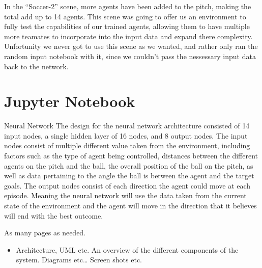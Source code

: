 In the “Soccer-2” scene, more agents have been added to the pitch, making the total add up to 14 agents. This scene was going to offer us an environment to fully test the capabilities of our trained agents, allowing them to have multiple more teamates to incorporate into the input data and expand there complexity. Unfortunity we never got to use this scene as we wanted, and rather only ran the random input notebook with it, since we couldn’t pass the nessessary input data back to the network.

\section{Jupyter Notebook}

Neural Network
The design for the neural network architecture consisted of 14 input nodes, a single hidden layer of 16 nodes, and 8 output nodes. The input nodes consist of multiple different value taken from the environment, including factors such as the type of agent being controlled, distances between the different agents on the pitch and the ball, the overall position of the ball on the pitch, as well as data pertaining to the angle the ball is between the agent and the target goals. The output nodes consist of each direction the agent could move at each episode. Meaning the neural network will use the data taken from the current state of the environment and the agent will move in the direction that it believes will end with the best outcome.

As many pages as needed.
\begin{itemize}
\item Architecture, UML etc. An overview of the different components of the system. Diagrams etc… Screen shots etc.
\end{itemize}

